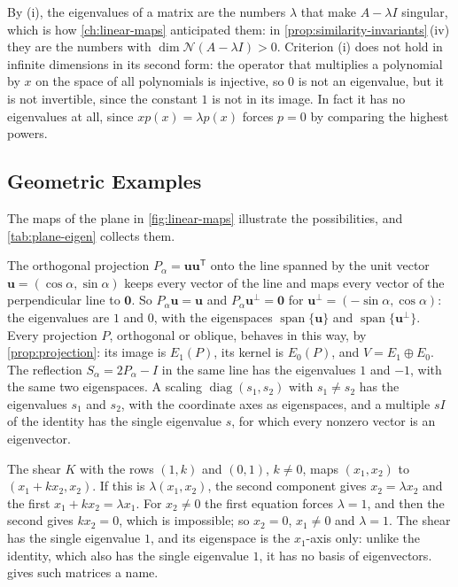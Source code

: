 By (i), the eigenvalues of a matrix are the numbers $\lambda$ that make $A-\lambda I$ singular, which is how \cref{ch:linear-maps} anticipated them: in \cref{prop:similarity-invariants}\,(iv) they are the numbers with $\dim\mathcal N(A-\lambda I)>0$. Criterion (i) does not hold in infinite dimensions in its second form: the operator that multiplies a polynomial by $x$ on the space of all polynomials is injective, so $0$ is not an eigenvalue, but it is not invertible, since the constant $1$ is not in its image. In fact it has no eigenvalues at all, since $xp(x)=\lambda p(x)$ forces $p=0$ by comparing the highest powers.

\subsection{Geometric Examples}

The maps of the plane in \cref{fig:linear-maps} illustrate the possibilities, and \cref{tab:plane-eigen} collects them.

The orthogonal projection $P_\alpha=\mathbf u\mathbf u^{\mathsf T}$ onto the line spanned by the unit vector $\mathbf u=(\cos\alpha,\sin\alpha)$ keeps every vector of the line and maps every vector of the perpendicular line to $\mathbf 0$. So $P_\alpha\mathbf u=\mathbf u$ and $P_\alpha\mathbf u^\perp=\mathbf 0$ for $\mathbf u^\perp=(-\sin\alpha,\cos\alpha)$: the eigenvalues are $1$ and $0$, with the eigenspaces $\operatorname{span}\{\mathbf u\}$ and $\operatorname{span}\{\mathbf u^\perp\}$. Every projection $P$, orthogonal or oblique, behaves in this way, by \cref{prop:projection}: its image is $E_1(P)$, its kernel is $E_0(P)$, and $V=E_1\oplus E_0$. The reflection $S_\alpha=2P_\alpha-I$ in the same line has the eigenvalues $1$ and $-1$, with the same two eigenspaces. A scaling $\operatorname{diag}(s_1,s_2)$ with $s_1\ne s_2$ has the eigenvalues $s_1$ and $s_2$, with the coordinate axes as eigenspaces, and a multiple $sI$ of the identity has the single eigenvalue $s$, for which every nonzero vector is an eigenvector.

The shear $K$ with the rows $(1,k)$ and $(0,1)$, $k\ne0$, maps $(x_1,x_2)$ to $(x_1+kx_2,x_2)$. If this is $\lambda(x_1,x_2)$, the second component gives $x_2=\lambda x_2$ and the first $x_1+kx_2=\lambda x_1$. For $x_2\ne0$ the first equation forces $\lambda=1$, and then the second gives $kx_2=0$, which is impossible; so $x_2=0$, $x_1\ne0$ and $\lambda=1$. The shear has the single eigenvalue $1$, and its eigenspace is the $x_1$-axis only: unlike the identity, which also has the single eigenvalue $1$, it has no basis of eigenvectors.  gives such matrices a name.

